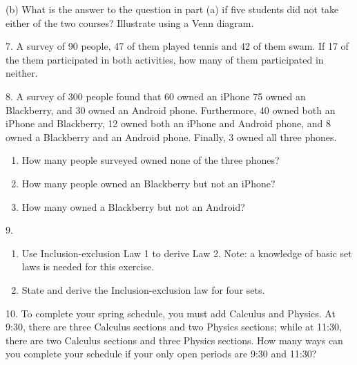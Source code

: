 \documentclass[10pt,]{book}
\theoremstyle{plain}
\theoremstyle{definition}
\begin{document}
\begin{exercisegroup}
 (b) What is the answer to the question in part (a) if five students did not take either of the two courses? Illustrate using a Venn diagram.
\par\smallskip
\item[7.]\hypertarget{exercise-79}{}A survey of 90 people, 47 of them played tennis and 42 of them swam. If 17 of the them participated in both activities, how many of them participated in neither.%
\par\smallskip
\item[8.]\hypertarget{exercise-80}{}A survey of 300 people found that 60 owned an iPhone 75 owned an Blackberry, and 30 owned an Android phone. Furthermore, 40 owned both an iPhone and Blackberry, 12 owned both an iPhone and Android phone, and 8 owned a Blackberry and an Android phone. Finally, 3 owned all three phones.%
\leavevmode%
\begin{enumerate}[label=(\alph*)]
\item\hypertarget{li-233}{} How many people surveyed owned none of the three phones?\item\hypertarget{li-234}{} How many people owned an Blackberry but not an iPhone?\item\hypertarget{li-235}{} How many owned a Blackberry but not an Android?\end{enumerate}
\par\smallskip
\end{exercisegroup}
\par\smallskip\noindent
\hypertarget{exercisegroup-15}{}\begin{exercisegroup}
\item[9.]\hypertarget{exercise-81}{}\leavevmode%
\begin{enumerate}[label=(\alph*)]
\item\hypertarget{li-236}{} Use Inclusion-exclusion Law 1 to derive Law 2. Note: a knowledge of basic set laws is needed for this exercise.\item\hypertarget{li-237}{} State and derive the Inclusion-exclusion law for four sets.\end{enumerate}
\par\smallskip
\item[10.]\hypertarget{exercise-82}{} To complete your spring schedule, you must add Calculus and Physics. At 9:30, there are three Calculus sections and two Physics sections; while at 11:30, there are two Calculus sections and three Physics sections.  How many ways can you complete your schedule if your only open periods are 9:30 and 11:30?\par\smallskip
\end{exercisegroup}
\end{document}
